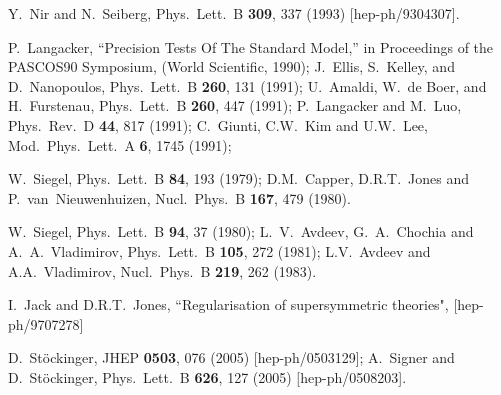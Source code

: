 \documentclass[12pt]{article}
\def\perspectives{in {\it Perspectives on Supersymmetry}, ed.
G.L.~Kane (World Scientific, 1998)}
\begin{document}
\begin{thebibliography}{999}
Y.~Nir and N.~Seiberg,
  Phys.\ Lett.\ B {\bf 309}, 337 (1993)
  [hep-ph/9304307].

P.~Langacker, ``Precision Tests Of The Standard Model,''
  in Proceedings of the PASCOS90 Symposium, 
  (World Scientific, 1990);
J.~Ellis, S.~Kelley, and D.~Nanopoulos, 
  Phys.\ Lett.\ B {\bf 260}, 131 (1991);
U.~Amaldi, W.~de Boer, and H.~Furstenau, 
  Phys.\ Lett.\ B {\bf 260}, 447 (1991);
P.~Langacker and M.~Luo,
  Phys.\ Rev.\ D {\bf 44}, 817 (1991);
C.~Giunti, C.W.~Kim and U.W.~Lee, 
  Mod.\ Phys.\ Lett.\ A {\bf 6}, 1745 (1991);

W.~Siegel, 
  Phys.\ Lett.\ B {\bf 84}, 193 (1979);
D.M.~Capper, D.R.T.~Jones and P.~van~Nieuwenhuizen,
  Nucl.\ Phys.\ B {\bf 167}, 479 (1980).

W.~Siegel, 
  Phys.\ Lett.\ B {\bf 94}, 37 (1980);
L.~V.~Avdeev, G.~A.~Chochia and A.~A.~Vladimirov,
  Phys.\ Lett.\ B {\bf 105}, 272 (1981);
L.V.~Avdeev and A.A.~Vladimirov, 
  Nucl.\ Phys.\ B {\bf 219}, 262 (1983).

I.~Jack and D.R.T.~Jones, 
  ``Regularisation of supersymmetric theories", 
  [hep-ph/9707278]

D.~St\"ockinger,
  JHEP {\bf 0503}, 076 (2005)
  [hep-ph/0503129];
A.~Signer and D.~St\"ockinger,
  Phys.\ Lett.\ B {\bf 626}, 127 (2005)
  [hep-ph/0508203].


\end{thebibliography}
\end{document}
